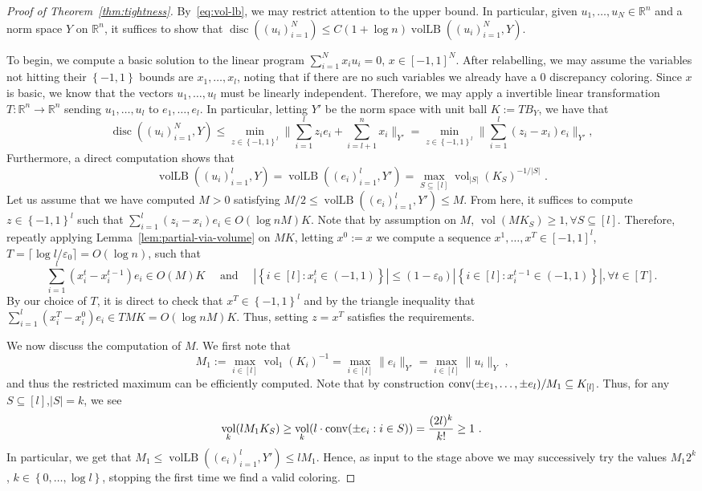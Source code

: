 \documentclass[12pt]{article}
\newcommand{\R}{{\mathbb{R}}}
\newcommand\eps{\varepsilon}
\newcommand{\set}[1]{\left\{ #1 \right\}}
\DeclareMathOperator{\vollb}{volLB}
\DeclareMathOperator{\disc}{disc}
\DeclareMathOperator{\vol}{vol}
\begin{document}
\begin{proof}[Proof of Theorem~\ref{thm:tightness}]
By~\eqref{eq:vol-lb}, we may restrict attention to the upper bound. In particular,
given $u_1,\dots,u_N \in \R^n$ and a norm space $Y$ on $\R^n$, it suffices to
show that $\disc((u_i)_{i=1}^N) \leq C(1+\log n)\vollb((u_i)_{i=1}^N,Y)$.  

To begin, we compute a basic solution to the linear program $\sum_{i=1}^N x_i
u_i = 0$, $x \in [-1,1]^N$. After relabelling, we may assume the variables not
hitting their $\set{-1,1}$ bounds are $x_1,\dots,x_l$, noting that if there are
no such variables we already have a $0$ discrepancy coloring. Since
$x$ is basic, we know that the vectors $u_1,\dots,u_l$ must be linearly
independent. Therefore, we may apply a invertible linear
transformation $T:\R^n \rightarrow \R^n$ sending $u_1,\dots,u_l$ to
$e_1,\dots,e_l$. In particular, letting $Y'$ be the norm space with unit ball $K
:= TB_Y$, we have that 
\[
\disc((u_i)_{i=1}^N,Y) \leq \min_{z \in \set{-1,1}^l} \|\sum_{i=1}^l z_i e_i +
\sum_{i=l+1}^n x_i\|_{Y'} = \min_{z \in \set{-1,1}^l} \|\sum_{i=1}^l (z_i-x_i)e_i\|_{Y'}, 
\] 
Furthermore, a direct computation shows that
\[
\vollb((u_i)_{i=1}^l,Y) = \vollb((e_i)_{i=1}^l,Y') = \max_{S \subseteq [l]}
\vol_{|S|}(K_S)^{-1/|S|} \text{ .}
\] 
Let us assume that we have computed $M > 0$ satisfying $M/2 \leq
\vollb((e_i)_{i=1}^l,Y') \leq M$. From here, it suffices to compute $z \in
\set{-1,1}^l$ such that $\sum_{i=1}^l (z_i-x_i) e_i \in O(\log n M) K$. Note
that by assumption on $M$, $\vol(MK_S) \geq 1, \forall S \subseteq [l]$.
Therefore, repeatly applying Lemma~\ref{lem:partial-via-volume} on $MK$, letting $x^0 := x$ we compute a sequence
$x^1,\dots,x^T \in [-1,1]^l$, $T = \lceil \log l/\eps_0
\rceil = O(\log n)$, such that 
\[
\sum_{i=1}^l (x^t_i-x^{t-1}_i)e_i \in O(M) K \quad \text{ and } \quad |\set{i
\in [l]:
x^t_i \in (-1,1)}| \leq (1-\eps_0)|\set{i \in [l]: x^{t-1}_i \in (-1,1)}|, \forall t \in [T] .
\]
By our choice of $T$, it is direct to check that $x^T \in \set{-1,1}^l$ and by
the triangle inequality that $\sum_{i=1}^l (x^T_i-x^0_i)e_i \in T M K = O(\log n
M) K$. Thus, setting $z = x^T$ satisfies the requirements.

We now discuss the computation of $M$. We first note that 
\[
M_1 := \max_{i \in [l]} \vol_1(K_i)^{-1} = \max_{i \in [l]} \|e_i\|_{Y'} =
\max_{i \in [l]} \|u_i\|_Y \text{ ,}
\]
and thus the restricted maximum can be efficiently computed. Note that by
construction ${\rm conv}(\pm e_1,\dots, \pm e_l)/M_1 \subseteq K_{[l]}$. Thus,
for any $S \subseteq [l]$,$|S|=k$, we see
\[
\vol_k(l M_1 K_S) \geq \vol_{k}(l \cdot {\rm conv}(\pm e_i: i \in S)) = \frac{(2l)^k}{k!}
 \geq 1 \text{ .}
\]
In particular, we get that $M_1 \leq \vollb((e_i)_{i=1}^l,Y') \leq l M_1$.
Hence, as input to the stage above we may successively try the values $M_1
2^k$, $k \in \set{0,\dots,\log l}$, stopping the first time we find a valid
coloring. 
\end{proof}
\end{document}
